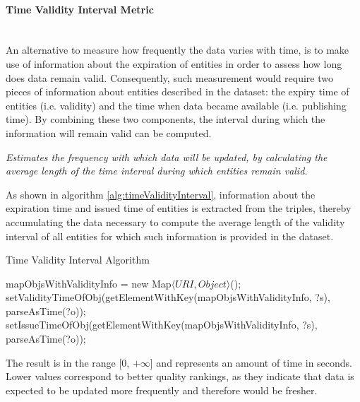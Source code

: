\paragraph{Time Validity Interval Metric} ~\\ %
An alternative to measure how frequently the data varies with time, is to make use of information about the expiration of entities in order to assess how long does data remain valid. Consequently, such measurement would require two pieces of information about entities described in the dataset: the expiry time of entities (i.e. validity) and the time when data became available (i.e. publishing time). By combining these two components, the interval during which the information will remain valid can be computed.
\begin{mdframed}[style=metricdefinition]
\emph{Estimates the frequency with which data will be updated, by calculating the average length of the time interval during which entities remain valid.}
\end{mdframed}

As shown in algorithm \ref{alg:timeValidityInterval}, information about the expiration time and issued time of entities is extracted from the triples, thereby accumulating the data necessary to compute the average length of the validity interval of all entities for which such information is provided in the dataset.
\begin{algorithm}
\caption{Time Validity Interval Algorithm} \label{alg:timeValidityInterval}
\begin{algorithmic}[1]
\State mapObjsWithValidityInfo = new Map$\langle URI, Object\rangle$();
\EndProcedure
{}
\State setValidityTimeOfObj(getElementWithKey(mapObjsWithValidityInfo, ?s), parseAsTime(?o));
\EndIf
{} 
\State setIssueTimeOfObj(getElementWithKey(mapObjsWithValidityInfo, ?s), parseAsTime(?o));
\EndIf ~\\
\EndProcedure
\end{algorithmic}
\end{algorithm}
The result is in the range [0, $+\infty$] and represents an amount of time in seconds. Lower values correspond to better quality rankings, as they indicate that data is expected to be updated more frequently and therefore would be fresher.

